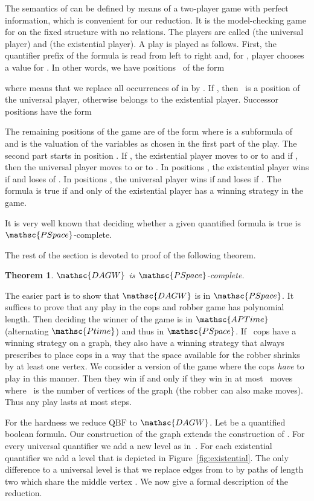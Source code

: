 \documentclass[authoryear]{article}
\newtheorem{theorem}{Theorem}
\theoremstyle{definition}
\newcommand{\0}{\emptyset}
\newcommand{\ptime}{\ensuremath{\mathsc{Ptime}}\xspace}
\newcommand{\pspace}{\ensuremath{\mathsc{PSpace}}\xspace}
\newcommand{\aptime}{\ensuremath{\mathsc{APTime}}\xspace}
\newcommand{\DAGWprob}{\ensuremath{\mathsc{DAGW}}\xspace}
\newcommand{\QBF}{\ensuremath{\mathrm{QBF}}\xspace}
\begin{document}
The semantics of  can be defined by means of a two-player game
with perfect information, which is convenient for our reduction. It is
the model-checking game  for  on the fixed structure
 with no relations. The
players are called  (the universal player) and  (the
existential player). A play is played as follows. First, the
quantifier prefix of the formula is read from left to right and, for
, player  chooses a value
 for . In other words, we have
positions~ of the form

where  means that we replace all occurrences of
 in  by . If , then~
is a position of the universal player, otherwise  belongs to the
existential player. Successor positions have the form 


The remaining positions of the game are of the form 
where  is a subformula of~ and  is the valuation
of the variables as chosen in the first part of the play. The second part
starts in position .  If ,
the existential player moves to  or to 
and if , then the universal player moves
to  or to . In positions
, the existential player wins if  and
loses of . In positions , the
universal player wins if  and loses if . The formula  is true if and only of the existential player has a
winning strategy in the game.

It is very well known that deciding whether a given quantified formula
is true is \pspace-complete. 

The rest of the section is devoted to proof of the following theorem.

\begin{theorem}\label{thm:dagw-pspace-c}
 \DAGWprob is \pspace-complete.
\end{theorem}
The easier part is to show that \DAGWprob is in \pspace. It suffices to prove
that any play in the cops and robber game has polynomial length. Then deciding
the winner of the game is in \aptime (alternating \ptime) and thus in
\pspace. If~ cops have a winning strategy on a graph, they also have a
winning strategy that always prescribes to place cops in a way that the space
available for the robber shrinks by at least one vertex. We consider a version
of the game where the cops \emph{have} to play in this manner. Then they win if
and only if they win in at most~ moves where~ is the number of vertices
of the graph (the robber can also make  moves). Thus any play lasts at most  steps.

For the hardness we reduce \QBF to \DAGWprob. Let  be a quantified
boolean formula. Our construction of the graph  extends the
construction of . For every universal
quantifier we add a new level as in~. For each existential quantifier we add a
level that is depicted in Figure~\ref{fig:existential}. The only
difference to a universal level is that we replace edges from
 to  by paths of length two which share the middle
vertex . We now give a formal
description of the reduction.
\end{document}
